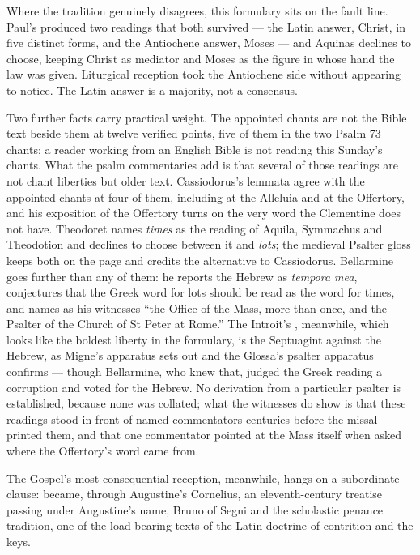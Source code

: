 Where the tradition genuinely disagrees, this formulary sits on the fault
line. Paul's  produced two readings that both
survived --- the Latin answer, Christ, in five distinct forms, and the
Antiochene answer, Moses --- and Aquinas declines to choose, keeping Christ as
mediator and Moses as the figure in whose hand the law was given. Liturgical
reception took the Antiochene side without appearing to notice. The Latin
answer is a majority, not a consensus.

Two further facts carry practical weight. The appointed chants are not
the Bible text beside them at twelve verified points, five of them in the two
Psalm 73 chants; a reader working from an English Bible is not reading this
Sunday's chants. What the psalm commentaries add is that several of those
readings are not chant liberties but older text. Cassiodorus's lemmata agree
with the appointed chants at four of them, including  at the Alleluia and  at the
Offertory, and his exposition of the Offertory turns on the very word the
Clementine does not have. Theodoret names \textit{times} as the reading of
Aquila, Symmachus and Theodotion and declines to choose between it and
\textit{lots}; the medieval Psalter gloss keeps both on the page and credits
the alternative to Cassiodorus. Bellarmine goes further than any of them: he
reports the Hebrew as \textit{tempora mea}, conjectures that the Greek word for
lots should be read as the word for times, and names as his witnesses ``the
Office of the Mass, more than once, and the Psalter of the Church of St Peter
at Rome.'' The Introit's , meanwhile, which looks
like the boldest liberty in the formulary, is the Septuagint against the
Hebrew, as Migne's apparatus sets out and the Glossa's psalter apparatus
confirms --- though Bellarmine, who knew that, judged the Greek reading a
corruption and voted for the Hebrew. No derivation from a particular psalter
is established, because none was collated; what the witnesses do show is that
these readings stood in front of named commentators centuries before the
missal printed them, and that one commentator pointed at the Mass itself when
asked where the Offertory's word came from.

The Gospel's most consequential reception, meanwhile, hangs on a subordinate
clause: 
became, through Augustine's Cornelius, an eleventh-century treatise passing
under Augustine's name, Bruno of Segni and the scholastic penance tradition,
one of the load-bearing texts of the Latin doctrine of contrition and the
keys.

